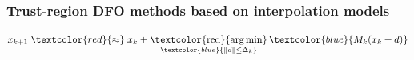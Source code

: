 \documentclass[slidestop,mathserif,xcolor=dvipsnames]{beamer}
\newcommand{\blue}[1]{\textcolor{blue}{#1}}
\newcommand{\red}[1]{\textcolor{red}{#1}}
\DeclareMathOperator*{\rargmin}{\textcolor{red}{arg\,min}}
\begin{document}
\begin{frame}
    \frametitle{Trust-region DFO methods based on interpolation models
    }
    \begin{figure}[htbp]
    \centering
\end{figure}
    \hspace{2.25cm}
    \begin{beamerboxesrounded}[width=7cm,shadow=true]{}
    \begin{equation*}
        x_{k+1} \;\red{\approx}\; x_k + \rargmin_{\blue{\|d\|\le \Delta_k}}
      \blue{M_k(x_k+d)}

\end{equation*}
\end{beamerboxesrounded}
\end{frame}
\end{document}

